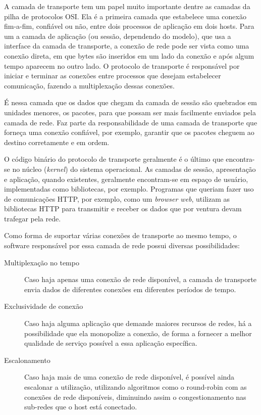 \documentclass[brazil,times,12pt]{abnt}
\begin{document}
	A camada de transporte tem um papel muito importante dentre as camadas da
	pilha de protocolos OSI. Ela é a primeira camada que estabelece uma conexão
	fim-a-fim, confiável ou não, entre dois processos de aplicação em dois hosts.
	Para um a camada de aplicação (ou sessão, dependendo do modelo), que usa a
	interface da camada de transporte, a conexão de rede pode ser vista como uma
	conexão direta, em que bytes são inseridos em um lado da conexão e após algum
	tempo aparecem no outro lado. O protocolo de transporte é responsável por
	iniciar e terminar as conexões entre processos que desejam estabelecer
	comunicação, fazendo a multiplexação dessas conexões.
	
	É nessa camada que os dados que chegam da camada de sessão são quebrados em
	unidades menores, os pacotes, para que possam ser mais facilmente enviados pela
	camada de rede. Faz parte da responsabilidade de uma camada de transporte que
	forneça uma conexão confiável, por exemplo, garantir que os pacotes cheguem
	ao destino corretamente e em ordem.
	
	O código binário do protocolo de transporte geralmente é o último que
	encontra-se no núcleo (\emph{kernel}) do sistema operacional. As camadas de
	sessão, apresentação e aplicação, quando existentes, geralmente encontram-se em
	espaço de usuário, implementadas como bibliotecas, por exemplo. Programas que
	queriam fazer uso de comunicações HTTP, por exemplo, como um \emph{browser
	web}, utilizam as bibliotecas HTTP para transmitir e receber os dados que por
	ventura devam trafegar pela rede.
	
	Como forma de suportar várias conexões de transporte ao mesmo tempo, o
	software responsável por essa camada de rede possui diversas
	possibilidades:
	
	\begin{description}
  		\item[Multiplexação no tempo] Caso haja apenas uma conexão de rede
  		disponível, a camada de transporte envia dados de diferentes conexões em
  		diferentes períodos de tempo.
  		\item[Exclusividade de conexão] Caso haja alguma aplicação que demande
  		maiores recursos de redes, há a possibilidade que ela monopolize a conexão,
  		de forma a fornecer a melhor qualidade de serviço possível a essa aplicação
  		específica.
  		\item[Escalonamento] Caso haja mais de uma conexão de rede disponível, é
  		possível ainda escalonar a utilização, utilizando algoritmos como o
  		round-robin com as conexões de rede disponíveis, diminuindo assim o
  		congestionamento nas sub-redes que o host está conectado.
	\end{description}
	
\end{document}
